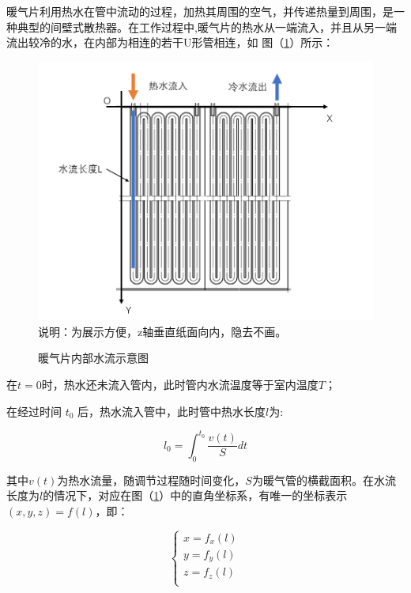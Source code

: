 \documentclass{my_paper}
\begin{document}
暖气片利用热水在管中流动的过程，加热其周围的空气，并传递热量到周围，是一种典型的间壁式散热器\cite{2}。在工作过程中,暖气片的热水从一端流入，并且从另一端流出较冷的水，在内部为相连的若干U形管相连，如 图（\ref{nuanqipian}）所示：

\begin {figure}[h]
\centering %
\includegraphics[width=\textwidth]{nuanqipian.png}
说明：为展示方便，z轴垂直纸面向内，隐去不画。
\caption{暖气片内部水流示意图} %
\label{nuanqipian}
\end {figure}

在$ t=0 $时，热水还未流入管内，此时管内水流温度等于室内温度$ T $；

在经过时间 $t_0$ 后，热水流入管中，此时管中热水长度$l$为:

\begin{equation}
l_0 = \int^{t_0}_{0}\frac{v(t)}{S}dt
\end{equation}

其中$ v(t) $为热水流量，随调节过程随时间变化，$ S $为暖气管的横截面积。在水流长度为$ l $的情况下，对应在图（\ref{nuanqipian}）中的直角坐标系，有唯一的坐标表示$(x,y,z)=f(l)$，即：

\begin{equation}
\begin{cases}
    x = f_x(l)\\
    y = f_y(l)\\
    z = f_z(l)\\
\end{cases}
\end{equation}
\end{document}
